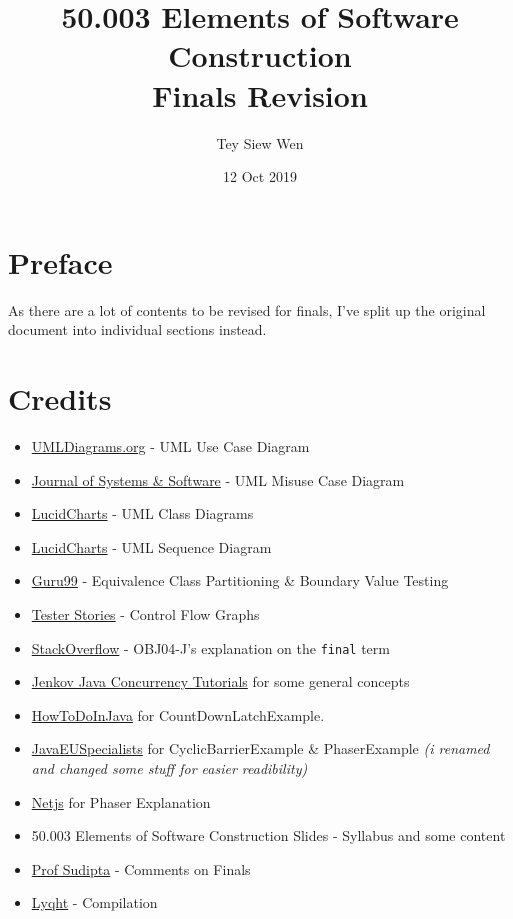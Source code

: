 \documentclass[a4paper]{article}
\title{50.003 Elements of Software Construction\\Finals Revision}
\author{Tey Siew Wen}
\date{12 Oct 2019}
\begin{document}
	
\maketitle

\section*{Preface}
As there are a lot of contents to be revised for finals, I've split up
the original document into individual sections instead.

\section*{Credits}
\begin{itemize}
	\item \href{https://www.uml-diagrams.org/use-case-diagrams.html}{UMLDiagrams.org} - UML Use Case Diagram
	\item \href{https://www.sciencedirect.com/science/article/pii/S0164121213002458}{Journal
		of Systems \& Software} - UML Misuse Case Diagram
	\item  \href{https://www.lucidchart.com/pages/uml-class-diagram}{LucidCharts} - UML Class Diagrams
	\item  \href{https://www.youtube.com/watch?v=pCK6prSq8aw}{LucidCharts} - UML Sequence Diagram
	\item  \href{https://www.guru99.com/equivalence-partitioning-boundary-value-analysis.html}{Guru99} - Equivalence Class Partitioning \& Boundary Value Testing
	\item \href{http://testerstories.com/2014/06/path-testing-the-coverage/}{Tester
		Stories} - Control Flow Graphs
	\item \href{https://stackoverflow.com/questions/22351222/can-we-change-the-value-of-a-final-variable-of-a-mutable-class}{StackOverflow}
	- OBJ04-J's explanation on the \texttt{final} term
	\item \href{http://tutorials.jenkov.com/java-concurrency/index.html}{Jenkov
		Java Concurrency Tutorials} for some general concepts
	\item \href{https://howtodoinjava.com/java/multi-threading/best-practices-for-using-concurrenthashmap/}{HowToDoInJava}
	for CountDownLatchExample.
	\item \href{https://www.javaspecialists.eu/archive/Issue257.html}{JavaEUSpecialists}
	for CyclicBarrierExample \& PhaserExample \emph{(i renamed and changed
		some stuff for easier readibility)}
	\item \href{https://netjs.blogspot.com/2016/01/phaser-in-java-concurrency.html}{Netjs}
	for Phaser Explanation
	\item 50.003 Elements of Software Construction Slides
	- Syllabus and some content
	\item \href{https://istd.sutd.edu.sg/people/faculty/sudipta-chattopadhyay}{Prof
		Sudipta} - Comments on Finals
	\item \href{https://github.com/lyqht}{Lyqht} -
	Compilation
	
\end{itemize}
\end{document}
